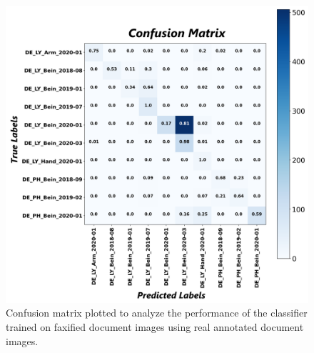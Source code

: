 \begin{figure}[H]
    \begin{center}
	\includegraphics[scale=0.25]{images/Appendix/Confusion_Matrix_Faxified_Data_Classifier_2021-05-31_19-31-35.png}
	\caption[Confusion matrix plotted to analyze the performance of the classifier trained on faxified document images using real annotated document images.]{Confusion matrix plotted to analyze the performance of the classifier trained on faxified document images using real annotated document images.}
	\label{fig:CMFaxifiedDocumentImagesClassifier}
	\end{center}
\end{figure}




